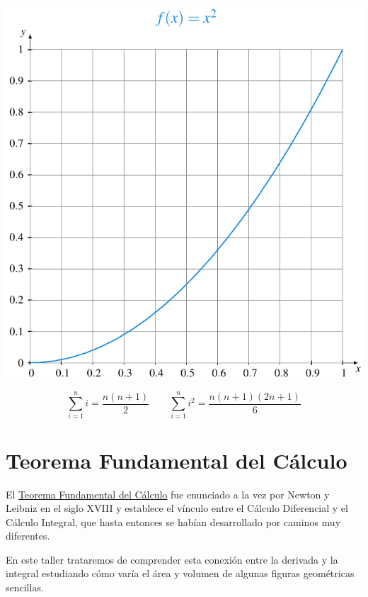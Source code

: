 \documentclass[
  a4paper,
]{scrreport}
\begin{document}
\includegraphics{./img/sumas-riemann/parabola-figure0.pdf}

\[
\sum_{i=1}^n i = \dfrac{n(n+1)}{2}\qquad \sum_{i=1}^n i^2 = \dfrac{n(n+1)(2n+1)}{6}
\]


\hypertarget{teorema-fundamental-del-cuxe1lculo}{%
\chapter{Teorema Fundamental del
Cálculo}\label{teorema-fundamental-del-cuxe1lculo}}

El
\href{https://aprendeconalf.es/analisis-manual/09-integrales.html\#thm-teorema-fundamental-calculo-1}{Teorema
Fundamental del Cálculo} fue enunciado a la vez por Newton y Leibniz en
el siglo XVIII y establece el vínculo entre el Cálculo Diferencial y el
Cálculo Integral, que hasta entonces se habían desarrollado por caminos
muy diferentes.

En este taller trataremos de comprender esta conexión entre la derivada
y la integral estudiando cómo varía el área y volumen de algunas figuras
geométricas sencillas.
\end{document}
